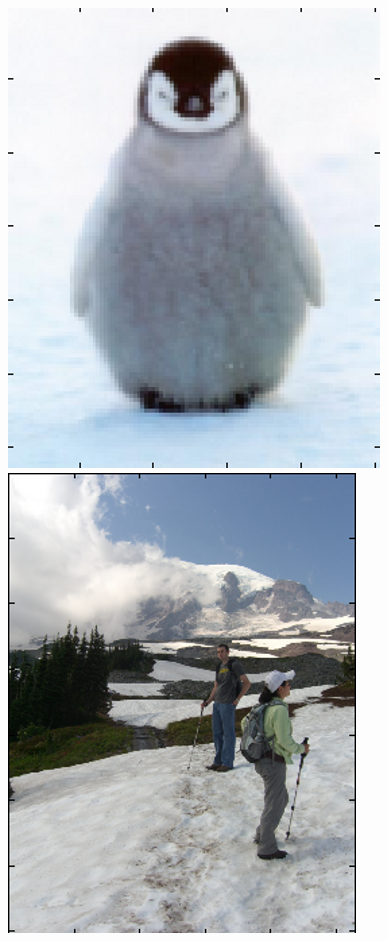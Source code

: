 \documentclass[11pt]{article}
\begin{document}
\begin{figure} [ht]
\begin{center}
\includegraphics[scale=0.44]{results_poisson/set1/im1.png}  
\includegraphics[scale=0.44]{results_poisson/set1/im2.png}

\end{center}
\end{figure}
\end{document}
